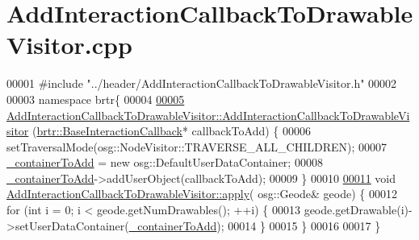 \hypertarget{_add_interaction_callback_to_drawable_visitor_8cpp_source}{\section{Add\+Interaction\+Callback\+To\+Drawable\+Visitor.\+cpp}
\label{_add_interaction_callback_to_drawable_visitor_8cpp_source}
}

\begin{DoxyCode}
00001 \textcolor{preprocessor}{#include "../header/AddInteractionCallbackToDrawableVisitor.h"}
00002 
00003 \textcolor{keyword}{namespace }brtr\{
00004 
\hypertarget{_add_interaction_callback_to_drawable_visitor_8cpp_source_l00005}{}\hyperlink{classbrtr_1_1_add_interaction_callback_to_drawable_visitor_a8c1ecd3629ec4f97d4bc2a63c56683d4}{00005}     
      \hyperlink{classbrtr_1_1_add_interaction_callback_to_drawable_visitor_a8c1ecd3629ec4f97d4bc2a63c56683d4}{AddInteractionCallbackToDrawableVisitor::AddInteractionCallbackToDrawableVisitor}
      (\hyperlink{classbrtr_1_1_base_interaction_callback}{brtr::BaseInteractionCallback}* callbackToAdd) \{
00006         setTraversalMode(osg::NodeVisitor::TRAVERSE\_ALL\_CHILDREN);
00007         \hyperlink{classbrtr_1_1_add_interaction_callback_to_drawable_visitor_ac23b4a99b1d35c2f7a32f048d4628927}{\_containerToAdd} = \textcolor{keyword}{new} osg::DefaultUserDataContainer;
00008         \hyperlink{classbrtr_1_1_add_interaction_callback_to_drawable_visitor_ac23b4a99b1d35c2f7a32f048d4628927}{\_containerToAdd}->addUserObject(callbackToAdd);
00009     \}
00010 
\hypertarget{_add_interaction_callback_to_drawable_visitor_8cpp_source_l00011}{}\hyperlink{classbrtr_1_1_add_interaction_callback_to_drawable_visitor_ace5d2fc7aa7c4a48f59e38728dac628a}{00011}     \textcolor{keywordtype}{void} \hyperlink{classbrtr_1_1_add_interaction_callback_to_drawable_visitor_ace5d2fc7aa7c4a48f59e38728dac628a}{AddInteractionCallbackToDrawableVisitor::apply}(
      osg::Geode& geode) \{
00012         \textcolor{keywordflow}{for} (\textcolor{keywordtype}{int} i = 0; i < geode.getNumDrawables(); ++i) \{
00013             geode.getDrawable(i)->setUserDataContainer(\hyperlink{classbrtr_1_1_add_interaction_callback_to_drawable_visitor_ac23b4a99b1d35c2f7a32f048d4628927}{\_containerToAdd});
00014         \}
00015     \}
00016 
00017 \}
\end{DoxyCode}
